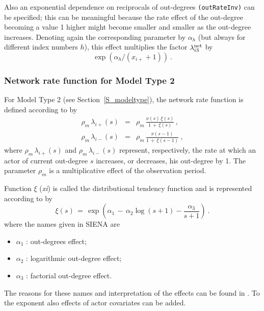 \documentclass[a4paper,fleqn,11pt]{article}
\newcommand{\+}{\, + \,}
\newcommand{\SI}{{\sf SIENA }}
\begin{document}
\begin{enumerate}
 Also an exponential dependence on reciprocals of out-degrees
 \texttt{(outRateInv)} can be specified;
 this can be meaningful because the rate effect of
 the out-degree becoming a value 1 higher might
 become smaller and smaller as the out-degree increases.
 Denoting again the corresponding parameter by $\alpha_h$
 (but always for different index numbers $h$),
 this effect multiplies the factor $\lambda^{\rm net}_{i3}$ by
 \[ \exp( \alpha_h / (x_{i+} +1)) \ . \]
\end{enumerate}

\iffalse
\subsubsection{Network rate function for Model Type 2}

For Model Type 2 (see Section~\ref{S_modeltype}), the network rate
function is defined according to \citet{Snijders03} by
\begin{eqnarray*}
  \rho_m\, \lambda_{i+}(s) & = &  \rho_m\,\frac{\nu(s)\, \xi(s)}{1 \,+\, \xi(s)}\, , \\
  \rho_m\, \lambda_{i-}(s) & = &  \rho_m\, \frac{\nu(s-1)}{1 \,+\, \xi(s-1)} \ ,
\end{eqnarray*}
where $ \rho_m\,\lambda_{i+}(s)$ and $ \rho_m\,\lambda_{i-}(s)$
represent, respectively, the rate at which an actor of current
out-degree $s$ increases, or decreases, his out-degree by 1. The
parameter $\rho_m$ is a multiplicative effect of the observation
period.

Function $\xi$ (\emph{xi}) is called the distributional tendency
function and is represented according to \citet[formula (17)]{Snijders03} by
\[ \xi(s) \,=\, \exp\left(\alpha_1 \,-\, \alpha_2 \log(s+1) - \frac{\alpha_3}{s+1}\right)  \ . \]
where the names given in \SI are
\begin{itemize}
 \item $\alpha_1$ : out-degrees effect;
 \item $\alpha_2$ : logarithmic out-degree effect;
 \item $\alpha_3$ : factorial out-degree effect.
\end{itemize}
The reasons for these names and interpretation of the effects
can be found in \citet{Snijders03}.
To the exponent also effects of actor covariates can be added.
\end{document}
